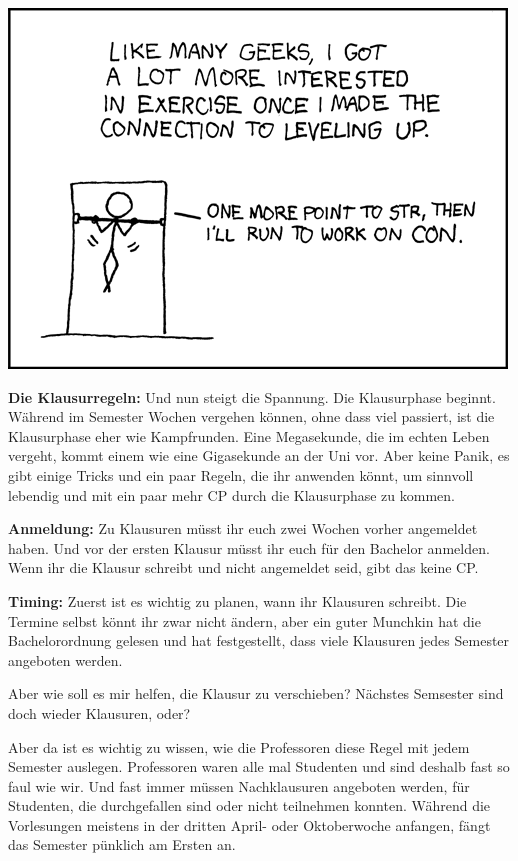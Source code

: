 \begin{center}
\includegraphics[width=\linewidth]{comics/exercise}\\
\end{center}

\textbf{Die Klausurregeln:}
Und nun steigt die Spannung. Die Klausurphase beginnt.
W\"ahrend im Semester Wochen vergehen k\"onnen, ohne dass viel passiert, ist die Klausurphase eher wie Kampfrunden.
Eine Megasekunde, die im echten Leben vergeht, kommt einem wie eine Gigasekunde an der Uni vor.
    Aber keine Panik, es gibt einige Tricks und ein paar Regeln, die ihr
anwenden k\"onnt, um sinnvoll lebendig und mit ein paar mehr CP durch die
Klausurphase zu kommen.

\textbf{Anmeldung:}
Zu Klausuren m\"usst ihr euch zwei Wochen vorher angemeldet haben. Und vor der ersten Klausur m\"usst ihr euch f\"ur den Bachelor anmelden.
Wenn ihr die Klausur schreibt und nicht angemeldet seid, gibt das keine CP.

\textbf{Timing:}
Zuerst ist es wichtig zu planen, wann ihr Klausuren schreibt.
Die Termine selbst k\"onnt ihr zwar nicht \"andern, aber ein guter Munchkin hat die Bachelorordnung gelesen
und hat festgestellt, dass viele Klausuren jedes Semester angeboten werden.

Aber wie soll es mir helfen, die Klausur zu verschieben?
N\"achstes Semsester sind doch wieder Klausuren, oder?

Aber da ist es wichtig
zu wissen, wie die Professoren diese Regel mit jedem Semester auslegen.
Professoren waren alle mal Studenten und sind deshalb fast so faul wie wir.
Und fast immer m\"ussen Nachklausuren angeboten werden, f\"ur Studenten, die durchgefallen sind oder nicht teilnehmen konnten.
W\"ahrend die Vorlesungen meistens in der dritten April- oder Oktoberwoche anfangen, f\"angt das Semester p\"unklich am Ersten an.

